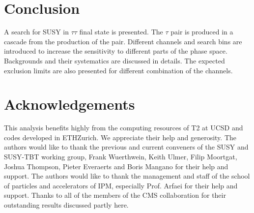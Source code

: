 \section{Conclusion}
\label{sect:conclusion}
A search for SUSY in $\tau\tau$ final state is presented. The $\tau$ pair is produced in a cascade from the production of the \PSGcpDo pair.
Different channels and search bins are introduced to increase the sensitivity to different parts of the phase space. 
Backgrounds and their systematics are discussed in details. The expected exclusion limits are also presented for different combination of the 
channels.

\section{Acknowledgements}
This analysis benefits highly from the computing resources of T2 at UCSD and codes developed in ETHZurich. 
We appreciate their help and generosity.
The authors would like to thank the previous and current conveners of the SUSY and SUSY-TBT working group, Frank Wuerthwein, Keith Ulmer, Filip Moortgat, Joshua Thompson, Pieter Everaerts and Boris Mangano for their help and support. 
The authors would like to thank the management and staff of the school of particles 
and accelerators of IPM, especially Prof. Arfaei for their help and support. 
Thanks to all of the members of
the CMS collaboration for their outstanding results discussed partly here.
